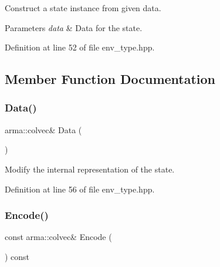 Construct a state instance from given data. 


\begin{DoxyParams}{Parameters}
{\em data} & Data for the state. \\
\hline
\end{DoxyParams}


Definition at line 52 of file env\+\_\+type.\+hpp.



\subsection{Member Function Documentation}
\mbox{\label{classmlpack_1_1rl_1_1DiscreteActionEnv_1_1State_ad6a50c7b5fced2e931d9a4b4ff989ed6}} 
\subsubsection{Data()}
{\footnotesize\ttfamily arma\+::colvec\& Data (\begin{DoxyParamCaption}{ }\end{DoxyParamCaption})\hspace{0.3cm}{\ttfamily [inline]}}



Modify the internal representation of the state. 



Definition at line 56 of file env\+\_\+type.\+hpp.

\mbox{\label{classmlpack_1_1rl_1_1DiscreteActionEnv_1_1State_a8c1a320788b55fad936455caf0acb62a}} 
\subsubsection{Encode()}
{\footnotesize\ttfamily const arma\+::colvec\& Encode (\begin{DoxyParamCaption}{ }\end{DoxyParamCaption}) const\hspace{0.3cm}{\ttfamily [inline]}}



